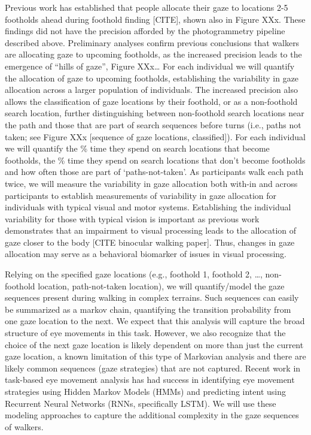 Previous work has established that people allocate their gaze to locations 2-5 footholds ahead during foothold finding [CITE], shown also in Figure XXx. These findings did not have the precision afforded by the photogrammetry pipeline described above. Preliminary analyses confirm previous conclusions that walkers are allocating gaze to upcoming footholds, as the increased precision leads to the emergence of ``hills of gaze'',
Figure XXx\ldots{} For each individual we will quantify the allocation of gaze to upcoming footholds, establishing the variability in gaze allocation across a larger population of individuals. The increased precision also allows the classification of gaze locations by their
foothold, or as a non-foothold search location, further distinguishing between non-foothold search locations near the path and those that are part of search sequences before turns (i.e., paths not taken; see Figure XXx [sequence of gaze locations, classified]). For each individual we will quantify the \% time they spend on search locations that become
footholds, the \% time they spend on search locations that don't become footholds and how often those are part of `paths-not-taken'. As participants walk each path twice, we will measure the variability in gaze allocation both with-in and across participants to establish measurements of variability in gaze allocation for individuals with typical visual and motor systems. Establishing the individual variability for those with typical vision is important as previous work demonstrates that an impairment to visual processing leads to the allocation of gaze closer to the body [CITE binocular walking paper]. Thus, changes in gaze allocation may serve as a behavioral biomarker of issues in visual processing.

Relying on the specified gaze locations (e.g., foothold 1, foothold 2, \ldots, non-foothold location, path-not-taken location), we will quantify/model the gaze sequences present during walking in complex terrains. Such sequences can easily be summarized as a markov chain, quantifying the transition probability from one gaze location to the next. We expect that this analysis will capture the broad structure of eye movements in this task. However, we also recognize that the choice of the next gaze location is likely dependent on more than just the current gaze location, a known limitation of this type of Markovian analysis and there are likely common sequences (gaze strategies) that are not captured. Recent work in task-based eye movement analysis has had success in identifying eye movement strategies using Hidden Markov Models (HMMs) and predicting intent using Recurrent Neural Networks (RNNs, specifically LSTM). We will use these modeling approaches to capture the additional complexity in the gaze sequences of walkers.

